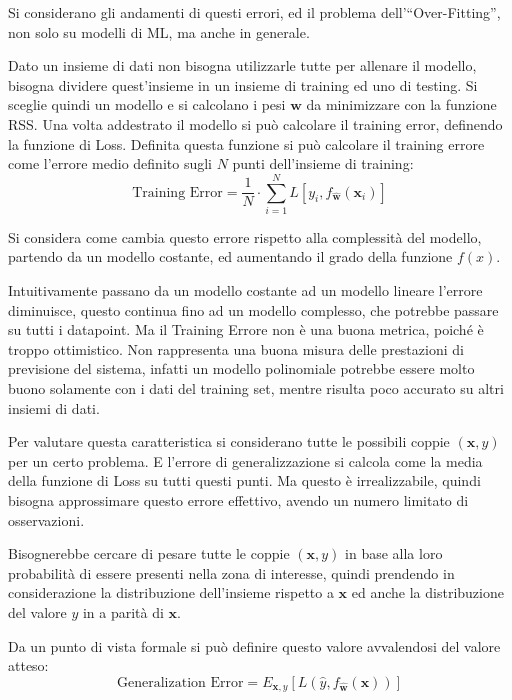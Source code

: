 \documentclass{article}
\numberwithin{equation}{subsection}
\newcommand{\vect}[1]{\boldsymbol{\mathbf{#1}}}
\begin{document}
Si considerano gli andamenti di questi errori, ed il problema dell'``Over-Fitting'', non solo su modelli di ML, ma anche in generale. 

Dato un insieme di dati non bisogna utilizzarle tutte per allenare il modello, bisogna 
dividere quest'insieme in un insieme di training ed uno di testing. Si sceglie quindi 
un modello e si calcolano i pesi $\vect{w}$ da minimizzare con la funzione RSS. 
Una volta addestrato il modello si può calcolare il training error, definendo la funzione di Loss. Definita questa funzione si può calcolare il training errore come l'errore medio definito sugli $N$ punti dell'insieme di training:
\begin{equation}
    \text{Training Error}=\displaystyle\frac{1}{N}\cdot\sum_{i=1}^NL[y_i,f_{\vect{\hat{w}}}(\vect{x}_i)]
\end{equation}

Si considera come cambia questo errore rispetto alla complessità del modello, partendo da un modello costante, ed aumentando il grado della funzione $f(x)$. 

Intuitivamente passano da un modello costante ad un modello lineare l'errore diminuisce, 
questo continua fino ad un modello complesso, che potrebbe passare su tutti i datapoint. 
Ma il Training Errore non è una buona metrica, poiché è troppo ottimistico. Non rappresenta una buona misura delle prestazioni di previsione del sistema, infatti un modello polinomiale potrebbe essere molto buono solamente con i dati del training set, mentre risulta 
poco accurato su altri insiemi di dati. 

Per valutare questa caratteristica si considerano tutte le possibili coppie $(\vect{x},y)$ 
per un certo problema. E l'errore di generalizzazione si calcola come la media della funzione di Loss su tutti questi punti. Ma questo è irrealizzabile, quindi bisogna approssimare questo errore effettivo, avendo un numero limitato di osservazioni. 

Bisognerebbe cercare di pesare tutte le coppie $(\vect{x}, y)$ in base alla loro probabilità di essere presenti nella zona di interesse, quindi prendendo in considerazione la 
distribuzione dell'insieme rispetto a $\vect{x}$ ed anche la distribuzione del valore $y$ in a parità di $\vect{x}$. 

Da un punto di vista formale si può definire questo valore avvalendosi del valore atteso:
\begin{equation}
    \text{Generalization Error}=E_{\vect{x},y}[L(\hat{y}, f_{\vect{\hat{w}}}(\vect{x}))] 
\end{equation}
\end{document}
